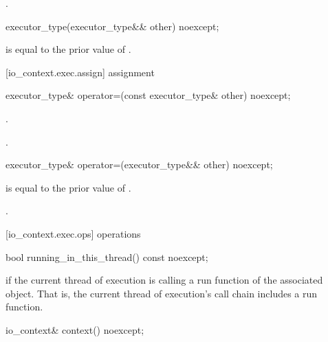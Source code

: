 \begin{itemdescr}
\pnum
\postconditions {}.
\end{itemdescr}

\begin{itemdecl}
executor_type(executor_type&& other) noexcept;
\end{itemdecl}

\begin{itemdescr}
\pnum
\postconditions {} is equal to the prior value of .
\end{itemdescr}



[io_context.exec.assign]{ assignment}

\begin{itemdecl}
executor_type& operator=(const executor_type& other) noexcept;
\end{itemdecl}

\begin{itemdescr}
\pnum
\postconditions {}.

\pnum
\returns {}.
\end{itemdescr}

\begin{itemdecl}
executor_type& operator=(executor_type&& other) noexcept;
\end{itemdecl}

\begin{itemdescr}
\pnum
\postconditions {} is equal to the prior value of .

\pnum
\returns {}.
\end{itemdescr}



[io_context.exec.ops]{ operations}

\begin{itemdecl}
bool running_in_this_thread() const noexcept;
\end{itemdecl}

\begin{itemdescr}
\pnum
\returns {} if the current thread of execution is calling a run function of the associated  object. \enternote That is, the current thread of execution's call chain includes a run function. \exitnote
\end{itemdescr}

\begin{itemdecl}
io_context& context() noexcept;
\end{itemdecl}


